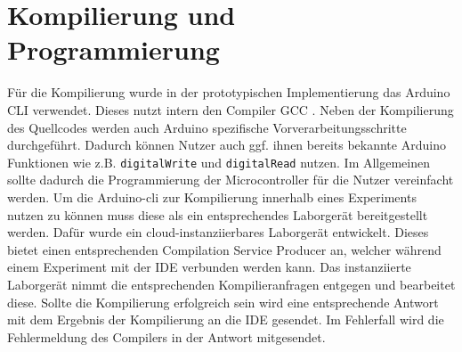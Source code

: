 \section{Kompilierung und Programmierung}\label{section:prototypische-implementierung:kompilierung-und-programmierung}


Für die Kompilierung wurde in der prototypischen Implementierung das \ac{Arduino CLI} \cite{noauthor_arduino-cli_nodate} verwendet. Dieses nutzt intern den Compiler \ac{GCC} \cite{noauthor_gcc_nodate}. Neben der Kompilierung des Quellcodes werden auch Arduino spezifische Vorverarbeitungsschritte durchgeführt. Dadurch können Nutzer auch ggf. ihnen bereits bekannte Arduino Funktionen wie z.B. \texttt{digitalWrite} und \texttt{digitalRead} nutzen. Im Allgemeinen sollte dadurch die Programmierung der Microcontroller für die Nutzer vereinfacht werden. Um die Arduino-cli zur Kompilierung innerhalb eines Experiments nutzen zu können muss diese als ein entsprechendes Laborgerät bereitgestellt werden. Dafür wurde ein cloud-instanziierbares Laborgerät entwickelt. Dieses bietet einen entsprechenden Compilation Service Producer an, welcher während einem Experiment mit der IDE verbunden werden kann. Das instanziierte Laborgerät nimmt die entsprechenden Kompilieranfragen entgegen und bearbeitet diese. Sollte die Kompilierung erfolgreich sein wird eine entsprechende Antwort mit dem Ergebnis der Kompilierung an die IDE gesendet. Im Fehlerfall wird die Fehlermeldung des Compilers in der Antwort mitgesendet.

